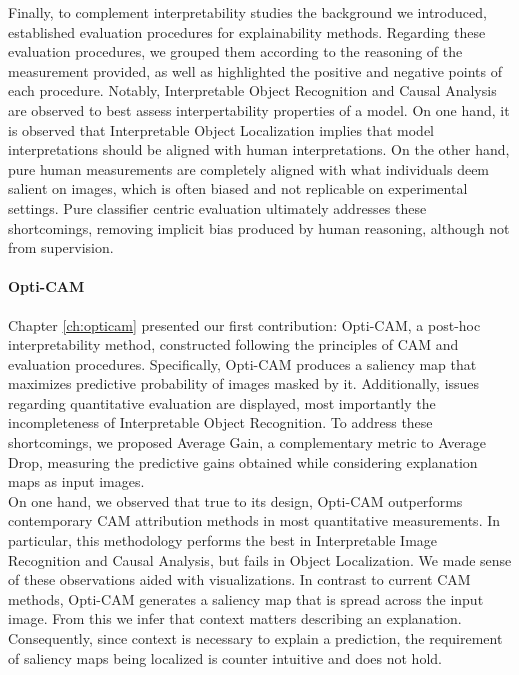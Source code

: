 \noindent Finally, to complement interpretability studies the background we introduced, established
evaluation procedures for explainability methods. Regarding these evaluation procedures, we grouped 
them according to the reasoning of the measurement provided, as well as highlighted the positive 
and negative points of each procedure. Notably, Interpretable Object Recognition and 
Causal Analysis are observed to best assess interpertability properties of a model. On one 
hand, it is observed that Interpretable Object Localization implies that model 
interpretations should be aligned with human interpretations. On the other hand, pure human 
measurements are completely aligned with what individuals deem salient on images, which is often 
biased and not replicable on experimental settings. Pure classifier centric evaluation 
ultimately addresses these shortcomings, removing implicit bias produced by human reasoning, 
although not from supervision.\\

\paragraph{Opti-CAM}
\noindent Chapter \ref{ch:opticam} presented our first contribution: Opti-CAM, a post-hoc 
interpretability method, constructed following the principles of CAM and evaluation 
procedures. Specifically, Opti-CAM produces a saliency map that maximizes predictive probability 
of images masked by it. Additionally, issues regarding quantitative evaluation are displayed, 
most importantly the incompleteness of Interpretable Object Recognition. To address these 
shortcomings, we proposed Average Gain, a complementary metric to Average Drop, measuring 
the predictive gains obtained while considering explanation maps as input images.\\


\noindent On one hand, we observed that true to its design, Opti-CAM outperforms contemporary 
CAM attribution methods in most quantitative measurements. In particular, this methodology 
performs the best in Interpretable Image Recognition and Causal Analysis, but fails in Object 
Localization. We made sense of these observations aided with visualizations. In contrast to 
current CAM methods, Opti-CAM generates a saliency map that is spread across the input image. 
From this we infer that context matters describing an explanation. Consequently, since context is 
necessary to explain a prediction, the requirement of saliency maps being localized is 
counter intuitive and does not hold.\\

